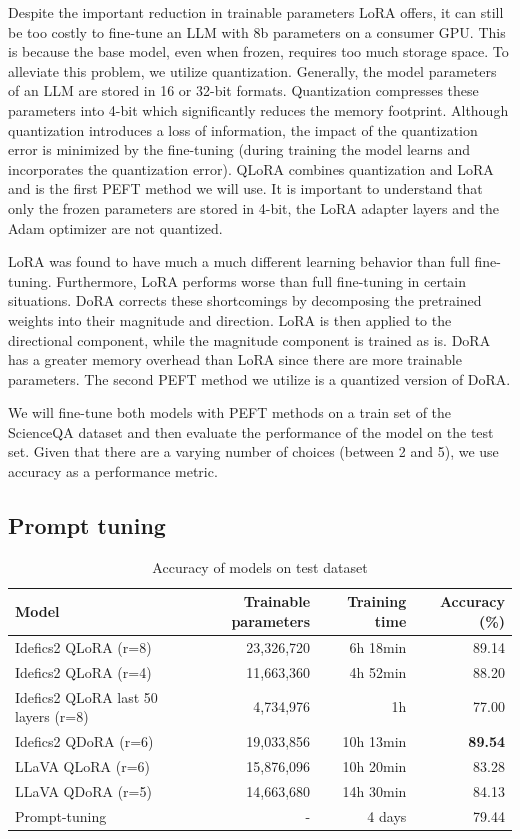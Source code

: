 \documentclass{article}
\begin{document}
Despite the important reduction in trainable parameters LoRA offers, it can still be too costly to fine-tune an LLM with 8b parameters on a consumer GPU. This is because the base model, even when frozen, requires too much storage space. To alleviate this problem, we utilize quantization. Generally, the model parameters of an LLM are stored in 16 or 32-bit formats. Quantization compresses these parameters into 4-bit which significantly reduces the memory footprint. Although quantization introduces a loss of information, the impact of the quantization error is minimized by the fine-tuning (during training the model learns and incorporates the quantization error). QLoRA combines quantization and LoRA and is the first PEFT method we will use. It is important to understand that only the frozen parameters are stored in 4-bit, the LoRA adapter layers and the Adam optimizer are not quantized.\par

LoRA was found to have much a much different learning behavior than full fine-tuning. Furthermore, LoRA performs worse than full fine-tuning in certain situations. DoRA corrects these shortcomings by decomposing the pretrained weights into their magnitude and direction. LoRA is then applied to the directional component, while the magnitude component is trained as is. DoRA has a greater memory overhead than LoRA since there are more trainable parameters. The second PEFT method we utilize is a quantized version of DoRA.\par

We will fine-tune both models with PEFT methods on a train set of the ScienceQA dataset and then evaluate the performance of the model on the test set. Given that there are a varying number of choices (between 2 and 5), we use accuracy as a performance metric.

\subsection{Prompt tuning}

\begin{table}[t]
  \centering
  \begin{tabular}{lrrr}
    \hline
    Model & Trainable parameters & Training time & Accuracy (\%)\\ 
    \hline
    Idefics2 QLoRA (r=8) & 23,326,720 & 6h 18min & 89.14\\ 
    Idefics2 QLoRA (r=4) & 11,663,360 & 4h 52min & 88.20\\ 
    Idefics2 QLoRA last 50 layers (r=8) & 4,734,976 & 1h & 77.00\\
    Idefics2 QDoRA (r=6) & 19,033,856 & 10h 13min & \textbf{89.54}\\
    LLaVA QLoRA (r=6) & 15,876,096 & 10h 20min & 83.28\\
    LLaVA QDoRA (r=5) & 14,663,680 & 14h 30min & 84.13\\
    Prompt-tuning & - & 4 days & 79.44\\
    \hline
  \end{tabular}
  \caption{Accuracy of models on test dataset}
  \label{tab:model_performance}
\end{table}
\end{document}
